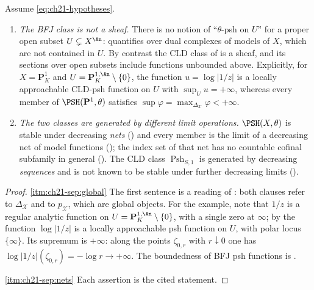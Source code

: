 \begin{proposition}
\label{prop:ch21-bfj-vs-cld}
Assume \eqref{eq:ch21-hypotheses}.
\begin{enumerate}
\item\label{itm:ch21-sep:global}
\emph{The BFJ class is not a sheaf.}  There is no notion of
``\(\theta\)-psh on \(U\)'' for a proper open subset
\(U\subsetneq X^{\An}\):  quantifies over dual
complexes of models of \(X\), which are not contained in \(U\).  By
contrast the CLD class of  is a sheaf, and its
sections over open subsets include functions unbounded above.  Explicitly,
for \(X=\mathbf P^1_K\) and \(U=\mathbf P^{1,\An}_K\setminus\{0\}\), the
function \(u=\log|1/z|\) is a locally approachable CLD-psh function on
\(U\) with \(\sup_Uu=+\infty\), whereas every member of
\(\PSH(\mathbf P^1,\theta)\) satisfies
\(\sup\varphi=\max_{\Delta_{\mathcal X}}\varphi<+\infty\).
\item\label{itm:ch21-sep:nets}
\emph{The two classes are generated by different limit operations.}
\(\PSH(X,\theta)\) is stable under decreasing \emph{nets}
() and every member is the limit of a
decreasing net of model functions
(); the index set of that net has no
countable cofinal subfamily in general
().  The CLD class
\(\operatorname{Psh}_{S,1}\) is generated by decreasing \emph{sequences} and
is not known to be stable under further decreasing limits
().
\end{enumerate}
\end{proposition}

\begin{proof}
\cref{itm:ch21-sep:global}  The first sentence is a reading of
: both clauses refer to \(\Delta_{\mathcal X}\) and
to \(p_{\mathcal X}\), which are global objects.  For the example, note that
\(1/z\) is a regular analytic function on
\(U=\mathbf P^{1,\An}_K\setminus\{0\}\), with a single zero at \(\infty\);
by  the function \(\log|1/z|\) is a
locally approachable psh function on \(U\), with polar locus
\(\{\infty\}\).  Its supremum is \(+\infty\): along the points
\(\zeta_{0,r}\) with \(r\downarrow0\) one has
\(\log|1/z|(\zeta_{0,r})=-\log r\to+\infty\).  The boundedness of BFJ psh
functions is .

\cref{itm:ch21-sep:nets}  Each assertion is the cited statement.
\end{proof}

